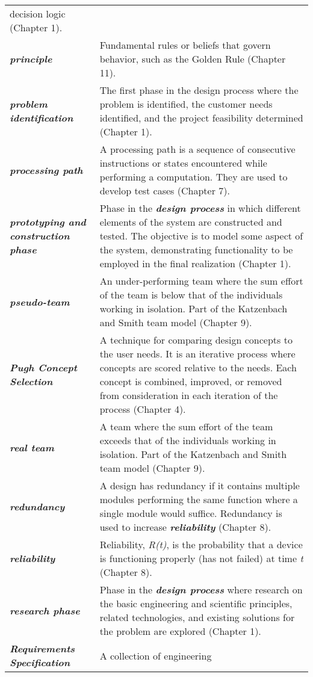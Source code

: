 \begin{longtable} { p{4cm} p{11cm}}
decision logic (Chapter 1). \\
\emph{\textbf{principle}} & Fundamental rules or beliefs that govern
behavior, such as the Golden Rule (Chapter 11). \\
\emph{\textbf{problem identification}} & The first phase in the design
process where the problem is identified, the customer needs identified,
and the project feasibility determined (Chapter 1). \\
\emph{\textbf{processing path}} & A processing path is a sequence of
consecutive instructions or states encountered while performing a
computation. They are used to develop test cases (Chapter 7). \\
\emph{\textbf{prototyping and construction phase}} & Phase in the
\emph{\textbf{design process}} in which different elements of the system
are constructed and tested. The objective is to model some aspect of the
system, demonstrating functionality to be employed in the final
realization (Chapter 1). \\
\emph{\textbf{pseudo-team}} & An under-performing team where the sum
effort of the team is below that of the individuals working in
isolation. Part of the Katzenbach and Smith team model (Chapter 9). \\
\emph{\textbf{Pugh Concept Selection}} & A technique for comparing
design concepts to the user needs. It is an iterative process where
concepts are scored relative to the needs. Each concept is combined,
improved, or removed from consideration in each iteration of the process
(Chapter 4). \\
\emph{\textbf{real team}} & A team where the sum effort of the team
exceeds that of the individuals working in isolation. Part of the
Katzenbach and Smith team model (Chapter 9). \\
\emph{\textbf{redundancy}} & A design has redundancy if it contains
multiple modules performing the same function where a single module
would suffice. Redundancy is used to increase
\emph{\textbf{reliability}} (Chapter 8). \\
\emph{\textbf{reliability}} & Reliability, \emph{R(t)}, is the
probability that a device is functioning properly (has not failed) at
time \emph{t} (Chapter 8). \\
\emph{\textbf{research phase}} & Phase in the \emph{\textbf{design
process}} where research on the basic engineering and scientific
principles, related technologies, and existing solutions for the problem
are explored (Chapter 1). \\
\emph{\textbf{Requirements Specification}} & A collection of engineering

\end{longtable}
